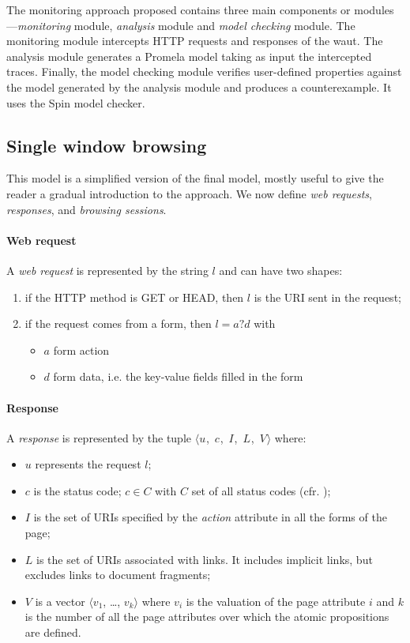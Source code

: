 \documentclass[a4paper,10pt]{article}
\newcommand{\res}[1][]{
  \ifthenelse{\equal{#1}{}}{\mbox{$\langle u$, $c$, $I$, $L$, $V\rangle$}}
  {\mbox{$\langle u_{#1}$, $c_{#1}$, $I_{#1}$, $L_{#1}$, $V_{#1}\rangle$}}
}
\begin{document}
The monitoring approach proposed contains three main components or modules---\textit{monitoring} module, \textit{analysis} module and \textit{model checking} module. The monitoring module intercepts HTTP requests and responses of the \gls{waut}. The analysis module generates a Promela model taking as input the intercepted traces. Finally, the model checking module verifies user-defined properties against the model generated by the analysis module and produces a counterexample. It uses the Spin model checker.

\subsection{Single window browsing}
\label{single-window-browsing}

This model is a simplified version of the final model, mostly useful to give the reader a gradual introduction to the approach. We now define \emph{web requests}, \emph{responses}, and \emph{browsing sessions}.

\paragraph{Web request}
A \emph{web request} is represented by the string $l$ and can have two shapes:

\begin{enumerate}
  \item if the HTTP method is GET or HEAD, then $l$ is the URI sent in the request;
  \item if the request comes from a form, then $l = a?d$ with
    \begin{itemize}
      \item $a$ form action
      \item $d$ form data, i.e. the key-value fields filled in the form
    \end{itemize}
\end{enumerate}

\paragraph{Response}
A \emph{response} is represented by the tuple \res where:

\begin{itemize}
  \item $u$ represents the request $l$;
  \item $c$ is the status code; $c \in C$ with $C$ set of all status codes (cfr. \cite[\S 15]{Fielding2022});
  \item $I$ is the set of URIs specified by the \textit{action} attribute in all the forms of the page;
  \item $L$ is the set of URIs associated with links. It includes implicit links, but excludes links to document fragments;
  \item $V$ is a vector $\langle$$v_1$, \dots, $v_k$$\rangle$ where $v_i$ is the valuation of the page attribute $i$ and $k$ is the number of all the page attributes over which the atomic propositions are defined.
\end{itemize}
\end{document}
